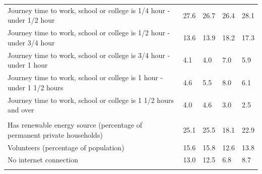 \documentclass{article}
\begin{document}
\begin{table}[h]
\begin{tabular}{KTTTT}
Journey time to work, school or college is 1/4 hour - under 1/2 hour & 27.6& 26.7& 26.4& 28.1\\
Journey time to work, school or college is 1/2 hour - under 3/4 hour & 13.6& 13.9& 18.2& 17.3\\
Journey time to work, school or college is 3/4 hour - under 1 hour & 4.1& 4.0& 7.0& 5.9\\
Journey time to work, school or college is 1 hour - under 1 1/2 hours & 4.6& 5.5& 8.0& 6.1\\
Journey time to work, school or college is 1 1/2 hours and over & 4.0& 4.6& 3.0& 2.5\\
\hline
    \\ 
    \hline
Has renewable energy source (percentage of permanent private households) & 25.1& 25.5& 18.1& 22.9\\
    \hline
Volunteers (percentage of population) & 15.6& 15.8& 12.6& 13.8\\
    \hline
No internet connection& 13.0& 12.5&  6.8&  8.7\\
\hline
\end{tabular}
\end{table}
\end{document}
